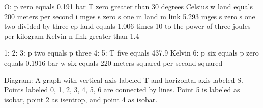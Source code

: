 O:
p zero equals 0.191 bar
T zero greater than 30 degrees Celsius
w land equals 200 meters per second
i mges s zero s one
m land m link 5.293
mges s zero s one
two divided by three
cp land equals 1.006 times 10 to the power of three joules per kilogram Kelvin
n link greater than 1.4

1:
2:
3:
p two equals p three
4:
5:
T five equals 437.9 Kelvin
6:
p six equals p zero equals 0.1916 bar
w six equals 220 meters squared per second squared

Diagram:
A graph with vertical axis labeled T and horizontal axis labeled S. Points labeled 0, 1, 2, 3, 4, 5, 6 are connected by lines. Point 5 is labeled as isobar, point 2 as isentrop, and point 4 as isobar.